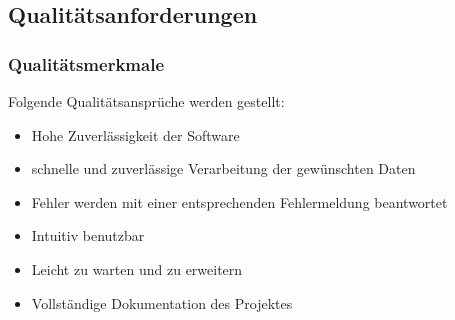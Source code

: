 

\subsection{\textbf{Qualitätsanforderungen}}

\subsubsection{Qualitätsmerkmale}
Folgende Qualitätsansprüche werden gestellt:
\begin{itemize}
	\item Hohe Zuverlässigkeit der Software
	\item schnelle und zuverlässige Verarbeitung der gewünschten Daten
	\item Fehler werden mit einer entsprechenden Fehlermeldung beantwortet
	\item Intuitiv benutzbar
	\item Leicht zu warten und zu erweitern
	\item Vollständige Dokumentation des Projektes
\end{itemize}









